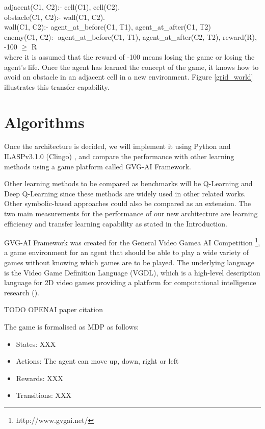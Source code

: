 adjacent(C1, C2):- cell(C1), cell(C2). \\
obstacle(C1, C2):- wall(C1, C2). \\
wall(C1, C2):- agent\_at\_before(C1, T1), agent\_at\_after(C1, T2) \\
enemy(C1, C2):- agent\_at\_before(C1, T1), agent\_at\_after(C2, T2), reward(R), -100 $\geq$ R \\

where it is assumed that the reward of -100 means losing the game or losing the agent's life. Once the agent has learned the concept of the game, it knows how to avoid an obstacle in an adjacent cell in a new environment. Figure \ref{grid_world} illustrates this transfer capability.



\section{Algorithms}
\label{algorithms}


Once the architecture is decided, we will implement it using Python and ILASPv3.1.0 (Clingo) \cite{Law2017}, and compare the performance with other learning methods using a game platform called GVG-AI Framework.

Other learning methods to be compared as benchmarks will be Q-Learning and Deep Q-Learning since these methods are widely used in other related works. Other symbolic-based approaches could also be compared as an extension. The two main measurements for the performance of our new architecture are learning efficiency and transfer learning capability as stated in the Introduction.

GVG-AI Framework was created for the General Video Gamea AI Competition \footnote{http://www.gvgai.net/}, a game environment for an agent that should be able to play a wide variety of games without knowing which games are to be played.
The underlying language is the Video Game Definition Language (VGDL), which is a high-level description language for 2D video games providing a platform for computational intelligence research (\cite{Schaul2013}).

TODO OPENAI paper citation

The game is formalised as MDP as follows:

\begin{itemize}

\item States: XXX
\item Actions: The agent can move up, down, right or left
\item Rewards: XXX
\item Transitions: XXX

\end{itemize}


